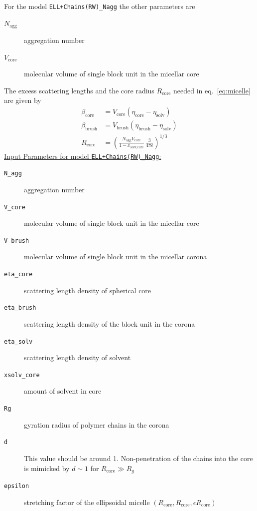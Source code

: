 \noindent
For the model \texttt{ELL+Chains(RW)\_Nagg} the other parameters are
\begin{description}
\item[$N_\text{agg}$] aggregation number
\item[$V_\text{core}$] molecular volume of single block unit in the micellar core
\end{description}
The excess scattering lengths and the core radius $R_\text{core}$ needed in eq.\
\ref{eq:micelle} are given by
\begin{align}
\beta_\text{core}  &= V_\text{core}  (\eta_\text{core} -\eta_\text{solv}) \\
\beta_\text{brush} &= V_\text{brush} (\eta_\text{brush}-\eta_\text{solv}) \\
R_\text{core} &= \left( \frac{N_\text{agg} V_\text{core}}{1-x_\text{solv,core}}
                        \, \frac{3}{4\pi\epsilon}\right)^{1/3}
\end{align}
\uline{Input Parameters for model \texttt{ELL+Chains(RW)\_Nagg}:}
\begin{description}
\item[\texttt{N\_agg}] aggregation number
\item[\texttt{V\_core}] molecular volume of single block unit in the micellar core
\item[\texttt{V\_brush}]  molecular volume of single block unit in the micellar corona
\item[\texttt{eta\_core}] scattering length density of spherical core
\item[\texttt{eta\_brush}] scattering length density of the block unit in the corona
\item[\texttt{eta\_solv}] scattering length density of solvent
\item[\texttt{xsolv\_core}] amount of solvent in core
\item[\texttt{Rg}] gyration radius of polymer chains in the corona
\item[\texttt{d}] This value should be around 1. Non-penetration of the chains
into the core is mimicked by $d\sim 1$ for $R_\text{core}\gg R_g$
\item[\texttt{epsilon}] stretching factor of the ellipsoidal micelle
$(R_\text{core},R_\text{core},\epsilon R_\text{core})$
\end{description}


